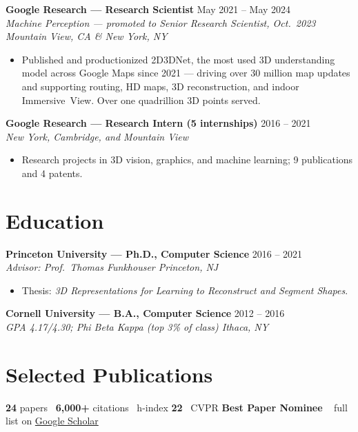 \documentclass[10.5pt]{article}
\newcommand{\entryhead}[3]{\textbf{#1} \hfill {\color{muted}#2}\\ \textit{#3}}
\begin{document}
\entryhead{Google Research — Research Scientist}{May 2021 -- May 2024}{Machine Perception --- promoted to Senior Research Scientist, Oct.\ 2023 \hfill Mountain View, CA \& New York, NY}
\begin{itemize}
  \item Published and productionized 2D3DNet, the most used 3D understanding model across Google Maps since 2021 --- driving over 30 million map updates and supporting routing, HD maps, 3D reconstruction, and indoor \mbox{Immersive View}. Over one quadrillion 3D points served.
\end{itemize}

\entryhead{Google Research — Research Intern (5 internships)}{2016 -- 2021}{New York, Cambridge, and Mountain View}
\begin{itemize}
  \item Research projects in 3D vision, graphics, and machine learning; 9 publications and 4 patents.
\end{itemize}

\section{Education}

\entryhead{Princeton University — Ph.D., Computer Science}{2016 -- 2021}{Advisor: Prof.\ Thomas Funkhouser \hfill Princeton, NJ}
\begin{itemize}
  \item Thesis: \textit{3D Representations for Learning to Reconstruct and Segment Shapes}.
\end{itemize}

\entryhead{Cornell University — B.A., Computer Science}{2012 -- 2016}{GPA 4.17/4.30; Phi Beta Kappa (top 3\% of class) \hfill Ithaca, NY}

\section{Selected Publications}

\textbf{24} papers \textbullet\ \textbf{6{,}000+} citations \textbullet\ h-index \textbf{22} \textbullet\ CVPR \textbf{Best Paper Nominee} \textbullet\ {\color{muted} full list on \href{https://scholar.google.com/citations?user=73HIeWcAAAAJ}{Google Scholar}}
\end{document}
